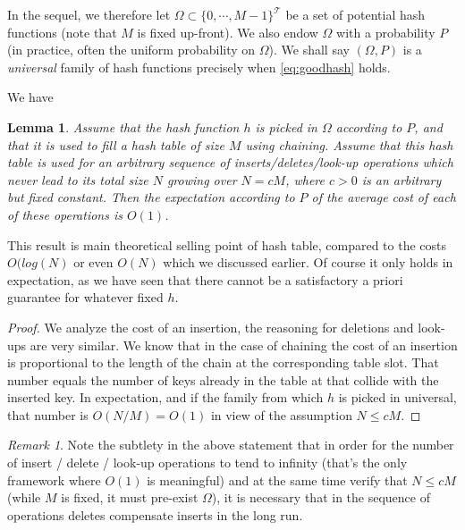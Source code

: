 \documentclass[12pt]{article}
\theoremstyle{plain}
\newtheorem{lemma}{Lemma}
\theoremstyle{remark}
\newtheorem*{remark}{Remark}
\begin{document}
In the sequel, we therefore let $\Omega \subset \{0,\cdots, M-1\}^\mathcal{T}$
be a set of potential hash functions (note that $M$ is fixed up-front). We also 
endow $\Omega$ with a probability $P$ (in practice, often the uniform
probability on $\Omega$). We shall say $(\Omega,P)$ is a {\it universal} family
of hash functions precisely
when \eqref{eq:goodhash} holds.

\medskip
We have

\begin{lemma}\label{lem:O1}
Assume that the hash function $h$ is picked in $\Omega$ according to
$P$, and that it is used to fill a hash table of size $M$ using chaining. 
Assume that this hash table is used for an arbitrary sequence of 
inserts/deletes/look-up operations which never lead to its total size 
$N$ growing over $N = cM$, where $c >0$ is an arbitrary but fixed
constant. Then the expectation according to $P$ of the average cost of 
each of these operations is $O(1)$. 
\end{lemma}

This result is main theoretical selling point of hash table, compared to 
the costs $O(log(N)$ or even $O(N)$ which we discussed earlier. Of course
it only holds in expectation, as we have seen that there cannot be a
satisfactory a priori guarantee for whatever fixed $h$. 

\begin{proof}
We analyze the cost of an insertion, the reasoning for deletions and look-ups
are very similar. We know that in the case of chaining the cost of an insertion is
proportional to the length of the chain at the corresponding table slot. That number equals 
the number of keys already in the table at that collide with the inserted key.
In expectation, and if the family from which $h$ is picked in universal, that
number is $O(N/M) = O(1)$ in view of the assumption $N \leq cM.$  
\end{proof}

\begin{remark} Note the subtlety in the above statement that in order for the number of
insert / delete / look-up operations to tend to infinity (that's the only 
framework where $O(1)$ is meaningful) and at the same time verify that $N \leq cM$ 
(while $M$ is fixed, it must pre-exist $\Omega$), it is necessary that
in the sequence of operations deletes compensate inserts in the long run. 
\end{remark}
\end{document}
